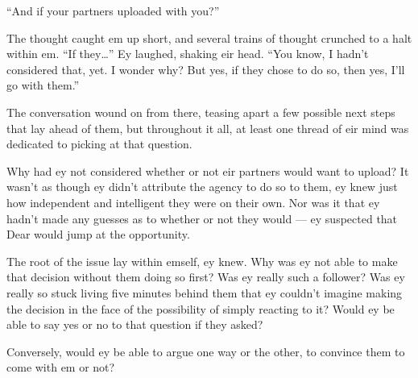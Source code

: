 ``And if your partners uploaded with you?''

The thought caught em up short, and several trains of thought crunched to a halt within em. ``If they\ldots{}'' Ey laughed, shaking eir head. ``You know, I hadn't considered that, yet. I wonder why? But yes, if they chose to do so, then yes, I'll go with them.''

The conversation wound on from there, teasing apart a few possible next steps that lay ahead of them, but throughout it all, at least one thread of eir mind was dedicated to picking at that question.

Why had ey not considered whether or not eir partners would want to upload? It wasn't as though ey didn't attribute the agency to do so to them, ey knew just how independent and intelligent they were on their own. Nor was it that ey hadn't made any guesses as to whether or not they would — ey suspected that Dear would jump at the opportunity.

The root of the issue lay within emself, ey knew. Why was ey not able to make that decision without them doing so first? Was ey really such a follower? Was ey really so stuck living five minutes behind them that ey couldn't imagine making the decision in the face of the possibility of simply reacting to it? Would ey be able to say yes or no to that question if they asked?

Conversely, would ey be able to argue one way or the other, to convince them to come with em or not?
